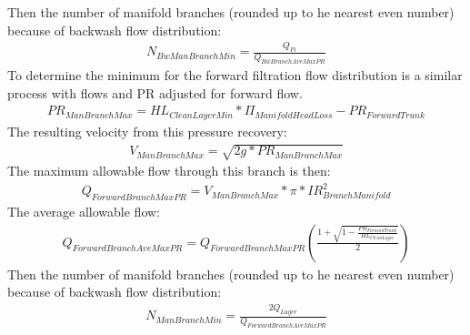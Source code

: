 \documentclass[letterpaper,10pt,english]{sphinxmanual}
\begin{document}
Then the number of manifold branches (rounded up to he nearest even number) because of backwash flow distribution:
\begin{equation}\label{equation:Filtration/Filtration_Derivations:Filtration/Filtration_Derivations:24}
\begin{split}N_{BwManBranchMin} =  \frac{Q_{Fi}}{Q_{BwBranchAveMaxPR}}\end{split}
\end{equation}\label{\detokenize{Filtration/Filtration_Derivations:heading-n-manifold-for-filt}}
To determine the minimum for the forward filtration flow distribution is a similar process with flows and PR adjusted for forward flow.
\begin{equation}\label{equation:Filtration/Filtration_Derivations:Filtration/Filtration_Derivations:25}
\begin{split}PR_{ManBranchMax} = HL_{CleanLayerMin}*\Pi_{ManifoldHeadLoss} - PR_{ForwardTrunk}\end{split}
\end{equation}
The resulting velocity from this pressure recovery:
\begin{equation}\label{equation:Filtration/Filtration_Derivations:Filtration/Filtration_Derivations:26}
\begin{split}V_{ManBranchMax} = \sqrt{2g*PR_{ManBranchMax}}\end{split}
\end{equation}
The maximum allowable flow through this branch is then:
\begin{equation}\label{equation:Filtration/Filtration_Derivations:Filtration/Filtration_Derivations:27}
\begin{split}Q_{ForwardBranchMaxPR} = V_{ManBranchMax}*\pi*IR_{BranchManifold}^2\end{split}
\end{equation}
The average allowable flow:
\begin{equation}\label{equation:Filtration/Filtration_Derivations:Filtration/Filtration_Derivations:28}
\begin{split}Q_{ForwardBranchAveMaxPR} = Q_{ForwardBranchMaxPR}(\frac{1 + \sqrt{1 - \frac{PR_{ForwardTrunk}}{HL_{CleanLayer}}}} {2} )\end{split}
\end{equation}
Then the number of manifold branches (rounded up to he nearest even number) because of backwash flow distribution:
\begin{equation}\label{equation:Filtration/Filtration_Derivations:Filtration/Filtration_Derivations:29}
\begin{split}N_{ManBranchMin} =  \frac{2Q_{Layer}}{Q_{ForwardBranchAveMaxPR}}\end{split}
\end{equation}
\end{document}
